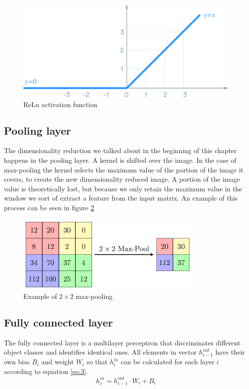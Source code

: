 \begin{figure}[H]
  \includegraphics[width=\linewidth]{plots/relu.png}
  \caption{ReLu activation function}
  \label{fig:relu}
\end{figure}

\subsection{Pooling layer}
The dimensionality reduction we talked about in the beginning of this chapter happens in the pooling layer. A kernel is shifted over the image. In the case of max-pooling the kernel selects the maximum value of the portion of the image it covers, to create the new dimensionality reduced image. A portion of the image value is theoretically lost, but because we only retain the maximum value in the window we sort of extract a feature from the input matrix. An example of this process can be seen in figure \ref{fig:pooling}
\begin{figure}[H]
  \includegraphics[width=\linewidth]{fig/maxpool.png}
  \caption{Example of $2\times2$ max-pooling}
  \label{fig:pooling}
\end{figure}

\subsection{Fully connected layer}
The fully connected layer is a multilayer perceptron that discriminates different object classes and identifies identical ones. All elements in vector $h_{i-1}^{out}$ have their own bias $B_i$ and weight $W_i$ so that $h_i^{in}$ can be calculated for each layer $i$ according to equation \ref{eq:3}.
\begin{equation} \label{eq:3}
  h_i^{in} = h_{i-1}^{out} \cdot W_i + B_i
\end{equation}


